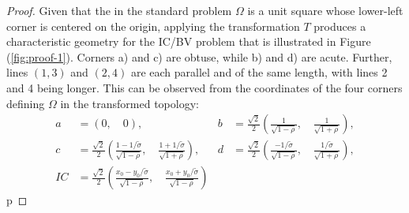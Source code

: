 \documentclass[10pt]{article}
\begin{document}
\begin{proof}
  Given that the in the standard problem $\Omega$ is a unit square
  whose lower-left corner is centered on the origin, applying the
  transformation $T$ produces a characteristic geometry for the IC/BV
  problem that is illustrated in Figure (\ref{fig:proof-1}). Corners
  a) and c) are obtuse, while b) and d) are acute. Further, lines
  $(1,3)$ and $(2, 4)$ are each parallel and of the same length, with
  lines 2 and 4 being longer. This can be observed from the
  coordinates of the four corners defining $\Omega$ in the transformed
  topology:
  \begin{align*}
    a &= (0,\quad 0),& 
                       b &= \frac{\sqrt{2}}{2} \left( \frac{1}{\sqrt{1-\rho}},\quad \frac{1}{\sqrt{1+\rho}} \right), \\
    c &= \frac{\sqrt{2}}{2} \left( \frac{1-1/\tilde{\sigma}}{\sqrt{1-\rho}},\quad \frac{1+1/\tilde{\sigma}}{\sqrt{1+\rho}} \right),&
                                                                                                                                     d &= \frac{\sqrt{2}}{2} \left( \frac{-1/\tilde{\sigma}}{\sqrt{1-\rho}},\quad \frac{1/\tilde{\sigma}}{\sqrt{1+\rho}} \right), \\
    IC &= \frac{\sqrt{2}}{2} \left( \frac{x_0 - y_0/\tilde{\sigma}}{\sqrt{1-\rho}},\quad \frac{x_0 + y_0/\tilde{\sigma}}{\sqrt{1-\rho}} \right)
  \end{align*}p


\end{proof}
\end{document}
